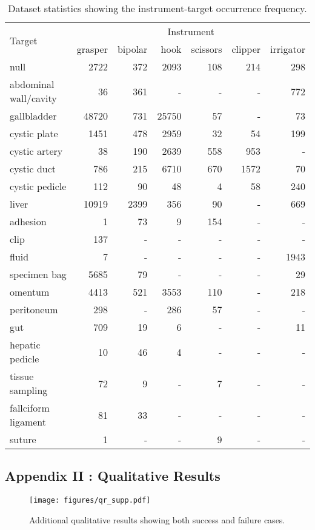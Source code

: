 \documentclass[english,runningheads,a4paper]{llncs}
\begin{document}
\begin{table}[!htbp]
\begin{center}
\vspace{-4mm}
\begin{tabular}{l@{\hskip 0.1in}|@{\hskip 0.1in}r@{\hskip 0.1in}r@{\hskip 0.1in}r@{\hskip 0.1in}r@{\hskip 0.1in}r@{\hskip 0.1in}r}
\multirow{2}{*}{Target} & \multicolumn{6}{c}{Instrument}   \\ \cline{2-7} & grasper  & bipolar  & hook & scissors & clipper  & irrigator \\ \hline
null  & 2722   &  372  &  2093  &   108   &  214   &  298\\
abdominal wall/cavity  & 36  &   361    &  -   &  -   &   -  &   772\\
gallbladder  & 48720  &   731  & 25750   &   57   &   -  &   73\\
cystic plate  & 1451   &  478  &  2959   &   32   &   54  &   199\\
cystic artery  &  38   &  190  &  2639  &   558  &   953   &    -\\
cystic duct  &  786  &   215  &  6710  &   670  &  1572   &   70\\
cystic pedicle  &  112   &   90   &   48    &   4    &  58   &  240\\
liver  &  10919  &  2399   &  356 &     90    &  -  &   669\\
adhesion  &   1  &    73    &   9  &   154    &  -    &  -\\
clip  &   137   &    -  &    -    &  -   &    -   &    -\\
fluid  &    7    &  -    &  -   &   -   &    -   & 1943\\
specimen bag  &  5685   &   79   &    -    &   -  &    -  &    29\\
omentum  &  4413  &   521  &  3553  &   110   &    -  &   218\\
peritoneum  &  298   &   -  &   286   &   57   &    -  &    -\\
gut  & 709  &    19   &    6    &   -    &  -   &   11\\
hepatic pedicle  &  10   &   46  &     4    &  -   &    -   &    -\\
tissue sampling  &   72    &   9    &   -    &   7    &   -    &  -\\
fallciform ligament  &  81    &  33   &    -   &   -   &   -   &    -\\
suture  &   1   &    -  &    -   &    9   &    -   &    -\\
\end{tabular}
\end{center}
\caption{Dataset statistics showing the instrument-target occurrence frequency.}
\label{table:data_stat2}
\end{table}




\clearpage


\subsection*{Appendix II : Qualitative Results}

\begin{figure}[!htbp]
\centering
    \texttt{[image: figures/qr\_supp.pdf]}
    \caption{Additional qualitative results showing both success and failure cases.}
\label{fig:successfailures}
\end{figure}

 
\end{document}
